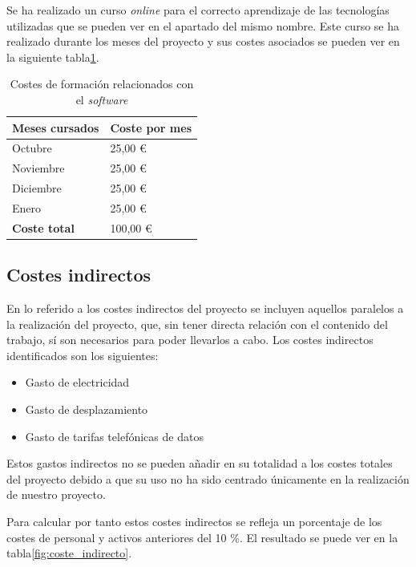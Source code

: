 Se ha realizado un curso \textit{online} para el correcto aprendizaje de las tecnologías utilizadas que se pueden ver en el apartado del mismo nombre. Este curso se ha realizado durante los meses del proyecto y sus costes asociados se pueden ver en la siguiente tabla\ref{fig:coste_sw}.


\begin{table}[htpb]
\centering
\begin{tabular}{|l|l|}
\hline
\textbf{Meses cursados} & \textbf{Coste por mes} \\ \hline
Octubre                 & 25,00 \euro                \\ \hline
Noviembre               & 25,00 \euro                \\ \hline
Diciembre               & 25,00 \euro                \\ \hline
Enero                   & 25,00 \euro                \\ \hline
\textbf{Coste total}    & 100,00 \euro               \\ \hline
\end{tabular}
\caption{Costes de formación relacionados con el \textit{software}}
\label{fig:coste_sw}
\end{table}


\subsection{Costes indirectos}
En lo referido a los costes indirectos del proyecto se incluyen aquellos paralelos a la realización del proyecto, que, sin tener directa relación con el contenido del trabajo, sí son necesarios para poder llevarlos a cabo. Los costes indirectos identificados son los siguientes:
\begin{itemize}
\item Gasto de electricidad
\item Gasto de desplazamiento
\item Gasto de tarifas telefónicas de datos
\end{itemize}


Estos gastos indirectos no se pueden añadir en su totalidad a los costes totales del proyecto debido a que su uso no ha sido centrado únicamente en la realización de nuestro proyecto.


Para calcular por tanto estos costes indirectos se refleja un porcentaje de los costes de personal y activos anteriores del 10 \%. El resultado se puede ver en la tabla\ref{fig:coste_indirecto}.


